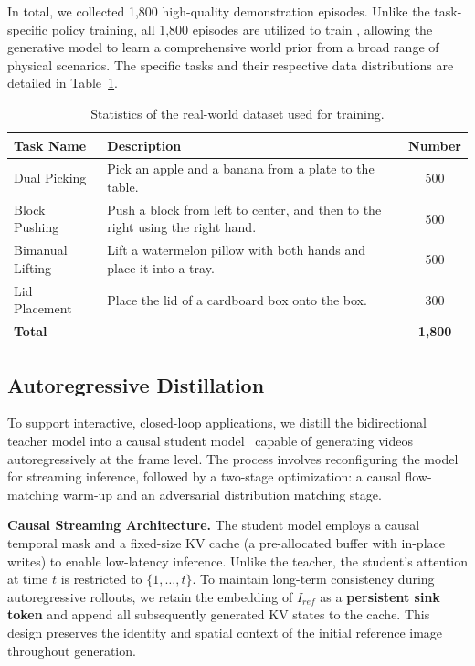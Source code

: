 In total, we collected 1,800 high-quality demonstration episodes. Unlike the task-specific policy training, all 1,800 episodes are utilized to train \our, allowing the generative model to learn a comprehensive world prior from a broad range of physical scenarios. The specific tasks and their respective data distributions are detailed in Table~\ref{tab:teleop_data_stats}.


\begin{table}[t]
\centering
\caption{Statistics of the real-world dataset used for \our training.}
\label{tab:teleop_data_stats}
\begin{tabular}{lp{8cm}c}
\hline
\textbf{Task Name} & \textbf{Description} & \textbf{Number} \\ \hline
\rowcolor{gray!10}Dual Picking & Pick an apple and a banana from a plate to the table. & 500 \\
Block Pushing & Push a block from left to center, and then to the right using the right hand. & 500 \\
\rowcolor{gray!10}Bimanual Lifting & Lift a watermelon pillow with both hands and place it into a tray. & 500 \\
Lid Placement & Place the lid of a cardboard box onto the box. & 300 \\
\rowcolor{headerpurple!60} \textbf{Total} & & \textbf{1,800} \\ \hline
\end{tabular}
\end{table}





\subsection{Autoregressive Distillation}
\label{sec:method:distillation}
To support interactive, closed-loop applications, we distill the bidirectional teacher model into a causal student model~\citep{huang2025self} capable of generating videos autoregressively at the frame level. The process involves reconfiguring the model for streaming inference, followed by a two-stage optimization: a causal flow-matching warm-up and an adversarial distribution matching stage.

\noindent 
\textbf{Causal Streaming Architecture.} 
The student model employs a causal temporal mask and a fixed-size KV cache (a pre-allocated buffer with in-place writes) to enable low-latency inference. Unlike the teacher, the student's attention at time $t$ is restricted to $\{1, \dots, t\}$. To maintain long-term consistency during autoregressive rollouts, we retain the embedding of $I_{ref}$ as a \textbf{persistent sink token} and append all subsequently generated KV states to the cache. This design preserves the identity and spatial context of the initial reference image throughout generation.

